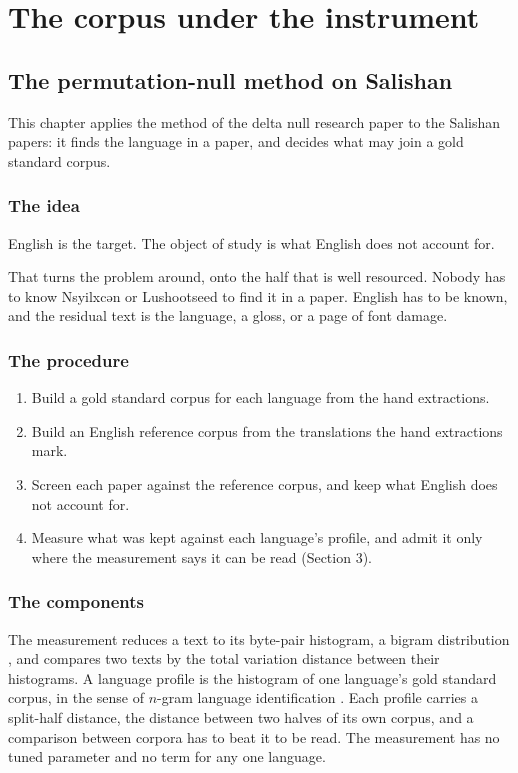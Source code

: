 \chapter{The corpus under the instrument}

\section{The permutation-null method on Salishan}

This chapter applies the method of the delta null research paper \cite{src:Quigg-delta-null} to the Salishan papers: it finds the language in a paper, and decides what may join a gold standard corpus.

\subsection{The idea}

English is the target. The object of study is what English does not account for.

That turns the problem around, onto the half that is well resourced. Nobody has to know Nsyilxcən or Lushootseed to find it in a paper. English has to be known, and the residual text is the language, a gloss, or a page of font damage.

\subsection{The procedure}

\begin{enumerate}
\item Build a gold standard corpus for each language from the hand extractions.
\item Build an English reference corpus from the translations the hand extractions mark.
\item Screen each paper against the reference corpus, and keep what English does not account for.
\item Measure what was kept against each language's profile, and admit it only where the measurement says it can be read (Section 3).
\end{enumerate}

\subsection{The components}

The measurement reduces a text to its byte-pair histogram, a bigram distribution \cite{src:Shannon-1948}, and compares two texts by the total variation distance between their histograms. A language profile is the histogram of one language's gold standard corpus, in the sense of $n$-gram language identification \cite{src:Cavnar-and-Trenkle-1994}. Each profile carries a split-half distance, the distance between two halves of its own corpus, and a comparison between corpora has to beat it to be read. The measurement has no tuned parameter and no term for any one language.

